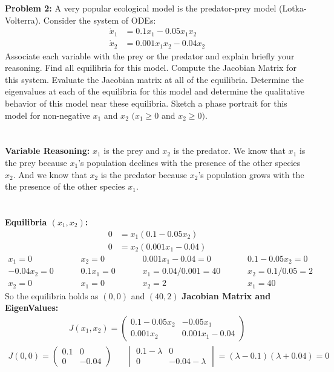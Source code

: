 \documentclass[12pt]{article}
\begin{document}
\noindent \textbf{Problem 2: }A very popular ecological model is the predator-prey model (Lotka-Volterra). Consider
the system of ODEs:
	\begin{align*}
		\dot{x}_1 &= 0.1x_1 - 0.05x_1x_2 \\
		\dot{x}_2 &= 0.001x_1x_2 - 0.04x_2
	\end{align*}
Associate each variable with the prey or the predator and explain briefly your reasoning. Find all equilibria for this model. Compute the Jacobian Matrix for this system. Evaluate the Jacobian matrix at all of the equilibria. Determine the eigenvalues at each of the equilibria for this model and determine the qualitative behavior of this model near these equilibria. Sketch a phase portrait for this model for non-negative $x_1$ and $x_2$ $(x_1 \geq 0$ and $x_2 \geq 0)$.	
\\ \\ \\
\noindent \textbf{Variable Reasoning: }$x_1$ is the prey and $x_2$ is the predator. We know that $x_1$ is the prey because $x_1$'s population declines with the presence of the other species $x_2$. And we know that $x_2$ is the predator because $x_2$'s population grows with the the presence of the other species $x_1$.
\\ \\ \\
\noindent \textbf{Equilibria $(x_1,x_2)$: }
	\begin{align*}
		0 &= x_1(0.1 - 0.05x_2) \\
		0 &= x_2(0.001x_1 - 0.04)
	\end{align*}
	\begin{align*}
		x_1 = 0 		&&&& x_2 = 0 	&&&& 0.001x_1 - 0.04 = 0		&&&& 0.1 - 0.05x_2 = 0\\
		-0.04x_2  = 0	&&&& 0.1x_1 = 0	&&&& x_1 = 0.04 / 0.001 = 40	&&&& x_2 = 0.1 / 0.05 = 2\\
		x_2 = 0 		&&&& x_1 = 0	&&&& x_2 = 2					&&&& x_1 = 40
	\end{align*}
So the equilibria holds as $(0,0)$ and $(40,2)$
\newpage
\noindent \textbf{Jacobian Matrix and EigenValues: }
	\begin{align*}
		J(x_1,x_2) = 
		\begin{pmatrix}
			0.1 - 0.05x_2 & -0.05x_1 \\
			0.001x_2 & 0.001x_1 - 0.04
		\end{pmatrix}
	\end{align*}
\vspace{\baselineskip}
	\begin{align*}
		J(0,0) = 
		\begin{pmatrix}
			0.1 & 0 \\
			0 & -0.04
		\end{pmatrix} &&
		\begin{vmatrix}
			0.1 - \lambda & 0 \\
			0 & -0.04 - \lambda 
		\end{vmatrix} = (\lambda - 0.1)(\lambda + 0.04) = 0
	\end{align*}
\end{document}

